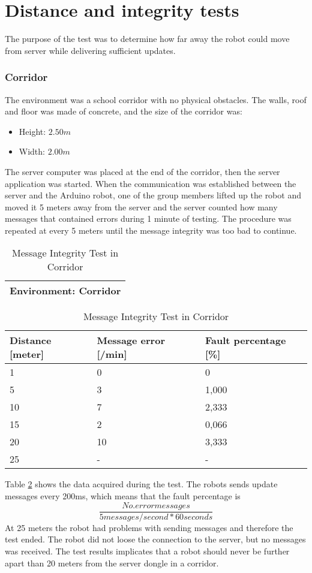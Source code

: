 \newpage
\section{Distance and integrity tests}
\label{sec:testcom}
The purpose of the test was to determine how far away the robot could move from server while delivering sufficient updates.
\subsubsection{Corridor}
The environment was a school corridor with no physical obstacles. The walls, roof and floor was made of concrete, and the size of the corridor was:
\begin{itemize}
    \item Height: $2.50 m$
    \item Width: $2.00 m$
\end{itemize}
The server computer was placed at the end of the corridor, then the server application was started. When the communication was established between the server and the Arduino robot, one of the group members lifted up the robot and moved it 5 meters away from the server and the server counted how many messages that contained errors during 1 minute of testing. The procedure was repeated at every 5 meters until the message integrity was too bad to continue.
\newpage
{}

\begin{table}[ht]
\begin{center}
 \begin{tabular}{|l|} 
 \hline
 Environment: \textbf{Corridor}\\
 \hline
 \end{tabular}
 \begin{tabular}{|l|l|l|}
 \hline
 Distance [meter] & Message error [/min] &  Fault percentage [\%]\\
 \hline
 1		        &   0 		&	0    \\
 5              &   3  		&	1,000\\
 10             &   7  		&	2,333\\
 15				&	2 		&	0,066\\
 20				&	10 		&	3,333\\
 25				&	-		&	-    \\
 \hline
\end{tabular}
\end{center}
\caption{Message Integrity Test in Corridor}
\label{tab:messintegritycorr}
\end{table}
Table \ref{tab:messintegritycorr} shows the data acquired during the test. The robots sends update messages every 200ms, which means that the fault percentage is $$\frac{No. error messages}{5 messages/second * 60 seconds}$$
At 25 meters the robot had problems with sending messages and therefore the test ended. The robot did not loose the connection to the server, but no messages was received. The test results implicates that a robot should never be further apart than 20 meters from the server dongle in a corridor.

